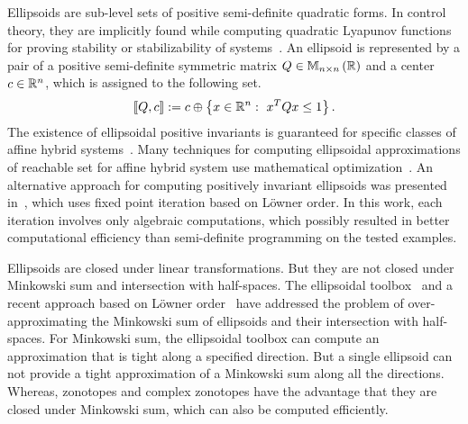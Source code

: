 Ellipsoids are sub-level sets of positive semi-definite quadratic
forms.  In control theory, they are implicitly found while computing
quadratic Lyapunov functions for proving stability or stabilizability of
systems~\cite{blanchini2008set}.  An ellipsoid is represented by a pair of a
positive semi-definite symmetric matrix $Q\in\mathbb{M}_{n\times n}\left(\mathbb{R}\right)$ and a center
$c\in\mathbb{R}^n$, which is assigned to the following set.
%
\[
\left\llbracket Q,c\right\rrbracket:=c\oplus\left\{x\in\mathbb{R}^n:~{x}^TQx\leq 1\right\}.
\]
%
The existence of ellipsoidal positive invariants is guaranteed for
specific classes of affine hybrid systems~\cite{shorten2003result}.  Many techniques
for computing ellipsoidal approximations of reachable set for affine
hybrid system use mathematical
optimization~\cite{blanchini2008set,kurzhanskiy2006ellipsoidal,DBLP:conf/hybrid/RouxJGF12}.  An
alternative approach for computing positively invariant ellipsoids was
presented in~\cite{DBLP:journals/tecs/AllamigeonGSGP16}, which uses
fixed point iteration based on L\"owner order.  In this work, each
iteration involves only algebraic computations, which possibly
resulted in better computational efficiency than semi-definite
programming on the tested examples.

Ellipsoids are closed under linear transformations.  But they are not
closed under Minkowski sum and intersection with half-spaces.  The
ellipsoidal toolbox~\cite{kurzhanskiy2006ellipsoidal} and a recent
approach based on L\"owner order~\cite{allamigeon2017fast} have addressed
the problem of over-approximating the Minkowski sum of ellipsoids and
their intersection with half-spaces.  For Minkowski sum, the
ellipsoidal toolbox can compute an approximation that is tight along a
specified direction.  But a single ellipsoid can not provide a tight
approximation of a Minkowski sum along all the directions.  Whereas,
zonotopes and complex zonotopes have the advantage that they are
closed under Minkowski sum, which can also be computed efficiently.

